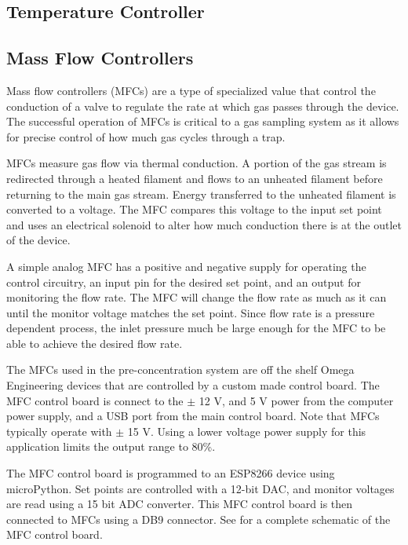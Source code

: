 \subsection{Temperature Controller}



\subsection{Mass Flow Controllers}
\label{Mass Flow Controller}

Mass flow controllers (MFCs) are a type of specialized value that control the conduction of a valve to regulate the rate at which gas passes through the device. The successful operation of MFCs is critical to a gas sampling system as it allows for precise control of how much gas cycles through a trap. 

MFCs measure gas flow via thermal conduction. A portion of the gas stream is redirected through a heated filament and flows to an unheated filament before returning to the main gas stream. Energy transferred to the unheated filament is converted to a voltage. The MFC compares this voltage to the input set point and uses an electrical solenoid to alter how much conduction there is at the outlet of the device.

A simple analog MFC has a positive and negative supply for operating the control circuitry, an input pin for the desired set point, and an output for monitoring the flow rate. The MFC will change the flow rate as much as it can until the monitor voltage matches the set point. Since flow rate is a pressure dependent process, the inlet pressure much be large enough for the MFC to be able to achieve the desired flow rate.

The MFCs used in the pre-concentration system are off the shelf Omega Engineering devices that are controlled by a custom made control board. The MFC control board is connect to the $\pm$ 12 V, and 5 V power from the computer power supply, and a USB port from the main control board. Note that MFCs typically operate with $\pm$ 15 V. Using a lower voltage power supply for this application limits the output range to 80\%. 

The MFC control board is programmed to an ESP8266 device using microPython. Set points are controlled with a 12-bit DAC, and monitor voltages are read using a 15 bit ADC converter. This MFC control board is then connected to MFCs using a DB9 connector. See  for a complete schematic of the MFC control board.


